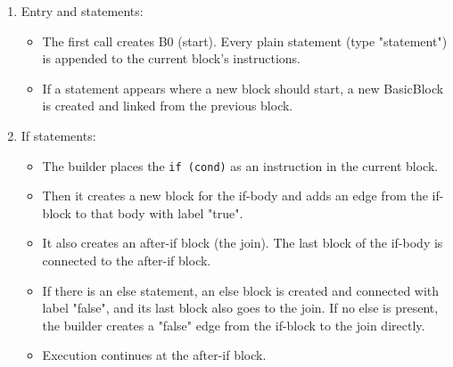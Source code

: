 \begin{enumerate}
    \item Entry and statements:
          \begin{itemize}
              \item The first call creates B0 (start). Every plain statement (type "statement") is
                    appended to the current block's instructions.
              \item If a statement appears where a new block should start, a new BasicBlock is
                    created and linked from the previous block.
          \end{itemize}
    \item If statements:
          \begin{itemize}
              \item The builder places the \texttt{if (cond)} as an instruction in the current
                    block.
              \item Then it creates a new block for the if-body and adds an edge from the if-block
                    to that body with label "true".
              \item It also creates an after-if block (the join). The last block of the if-body is
                    connected to the after-if block.
              \item If there is an else statement, an else block is created and connected with label
                    "false", and its last block also goes to the join. If no else is present, the
                    builder creates a "false" edge from the if-block to the join directly.
              \item Execution continues at the after-if block.
          \end{itemize}


\end{enumerate}
